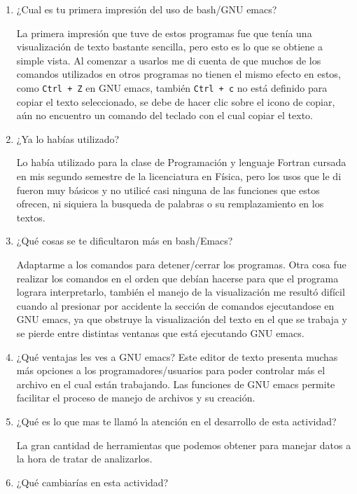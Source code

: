 \documentclass{article}
\begin{document}
\begin{enumerate}
\item{¿Cual es tu primera impresión del uso de bash/GNU emacs?}

La primera impresión que tuve de estos programas fue que tenía una visualización de texto bastante sencilla, pero esto es lo que se obtiene a simple vista. Al comenzar a usarlos me di cuenta de que muchos de los comandos utilizados en otros programas no tienen el mismo efecto en estos, como \verb#Ctrl + Z# en GNU emacs, también \verb#Ctrl + c# no está definido para copiar el texto seleccionado, se debe de hacer clic sobre el icono de copiar, aún no encuentro un comando del teclado con el cual copiar el texto.

\item{¿Ya lo habías utilizado?}

Lo había utilizado para la clase de Programación y lenguaje Fortran cursada en mis segundo semestre de la licenciatura en Física, pero los usos que le di fueron muy básicos y no utilicé casi ninguna de las funciones que estos ofrecen, ni siquiera la busqueda de palabras o su remplazamiento en los textos.

\item{¿Qué cosas se te dificultaron más en bash/Emacs?}

Adaptarme a los comandos para detener/cerrar los programas. Otra cosa fue realizar los comandos en el orden que debían hacerse para que el programa lograra interpretarlo, también el manejo de la visualización me resultó difícil cuando al presionar por accidente la sección de comandos ejecutandose en GNU emacs, ya que obstruye la visualización del texto en el que se trabaja y se pierde entre distintas ventanas que está ejecutando GNU emacs.

\item{¿Qué ventajas les ves a GNU emacs?}
Este editor de texto presenta muchas más opciones a los programadores/usuarios para poder controlar más el archivo en el cual están trabajando. Las funciones de GNU emacs permite facilitar el proceso de manejo de archivos y su creación.

\item{¿Qué es lo que mas te llamó la atención en el desarrollo de esta actividad?}

La gran cantidad de herramientas que podemos obtener para manejar datos a la hora de tratar de analizarlos.

\item{¿Qué cambiarías en esta actividad?}


\end{enumerate}
\end{document}
